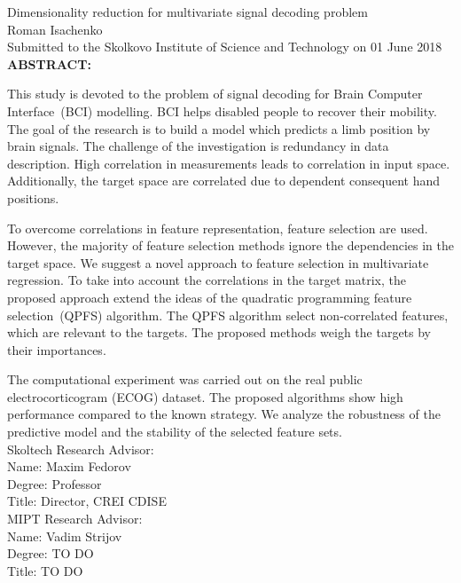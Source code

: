 \documentclass[12pt,oneside]{article}
\theoremstyle{definition}
\begin{document}
\setcounter{page}{3}
\begin{center}
	Dimensionality reduction for multivariate signal decoding problem\\ 
	Roman Isachenko \\[5mm]
	Submitted to the Skolkovo Institute of Science and Technology 
	on 01 June 2018 \\[5mm]
	\textbf{ABSTRACT:} 
\end{center}

This study is devoted to the problem of signal decoding for Brain Computer Interface~(BCI) modelling. 
BCI helps disabled people to recover their mobility.
The goal of the research is to build a model which predicts a limb position by brain signals. 
The challenge of the investigation is redundancy in data description. 
High correlation in measurements leads to correlation in input space. 
Additionally, the target space are correlated due to dependent consequent hand positions.

To overcome correlations in feature representation, feature selection are used.
However, the majority of feature selection methods ignore the dependencies in the target space.
We suggest a novel approach to feature selection in multivariate regression.
To take into account the correlations in the target matrix, the proposed approach extend the ideas of the quadratic programming feature selection~(QPFS) algorithm. 
The QPFS algorithm select non-correlated features, which are relevant to the targets. The proposed methods weigh the targets by their importances.

The computational experiment was carried out on the real public electrocorticogram (ECOG) dataset. 
The proposed algorithms show high performance compared to the known strategy.
We analyze the robustness of the predictive model and the stability of the selected feature sets.\\[5mm]
Skoltech Research Advisor: \\
Name: Maxim Fedorov \\
Degree: Professor \\
Title: Director, CREI CDISE \\[5mm]
MIPT Research Advisor: \\
Name: Vadim Strijov \\
Degree:{\color{red} TO DO} \\
Title: {\color{red} TO DO}

\newpage
\tableofcontents

\newpage
\end{document}
